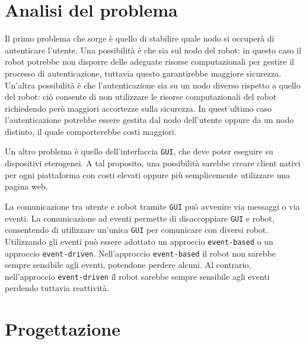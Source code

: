 \documentclass{llncs}
\newcommand{\action}[1]{\texttt{#1}\xspace}
\newcommand{\code}[1]{{\color{blue}\small{\texttt{#1}}}}
\newcommand{\labelsec}[1]{\label{sec:#1}}
\begin{document}

\section{Analisi del problema}
\labelsec{ProblemAnalysis}
Il primo problema che sorge è quello di stabilire quale nodo si occuperà di autenticare l'utente. Una possibilità è che sia sul nodo del robot: in questo caso il robot potrebbe non disporre delle adeguate risorse computazionali per gestire il processo di autenticazione, tuttavia questo garantirebbe maggiore sicurezza. Un'altra possibilità è che l'autenticazione sia su un nodo diverso rispetto a quello del robot: ciò consente di non utilizzare le risorse computazionali del robot richiedendo però maggiori accortezze sulla sicurezza. In quest'ultimo caso l'autenticazione potrebbe essere gestita dal nodo dell'utente oppure da un nodo distinto, il quale comporterebbe costi maggiori.

Un altro problema è quello dell'interfaccia \action{GUI}, che deve poter eseguire su dispositivi eterogenei. A tal proposito, una possibilità sarebbe creare client nativi per ogni piattaforma con costi elevati oppure più semplicemente utilizzare una pagina web. 

La comunicazione tra utente e robot tramite \action{GUI} può avvenire via messaggi o via eventi. La comunicazione ad eventi permette di disaccoppiare \action{GUI} e robot, consentendo di utilizzare un'unica \action{GUI} per comunicare con diversi robot. Utilizzando gli eventi può essere adottato un approccio \code{event-based} o un approccio \code{event-driven}. Nell'approccio \code{event-based} il robot non sarebbe sempre sensibile agli eventi, potendone perdere alcuni. Al contrario, nell'approccio \code{event-driven} il robot sarebbe sempre sensibile agli eventi perdendo tuttavia reattività.
\\





\section{Progettazione}
\labelsec{Project}
\end{document}
